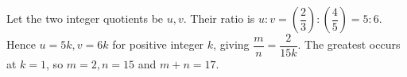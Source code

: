 Let the two integer quotients be $u,v$. Their ratio is $u:v=(\dfrac{2}{3}):(\dfrac{4}{5})=5:6$. Hence $u=5k,v=6k$ for positive integer $k$, giving $\dfrac{m}{n}=\dfrac{2}{15k}$. The greatest occurs at $k=1$, so $m=2,n=15$ and $\boxed{m+n=17}$.
